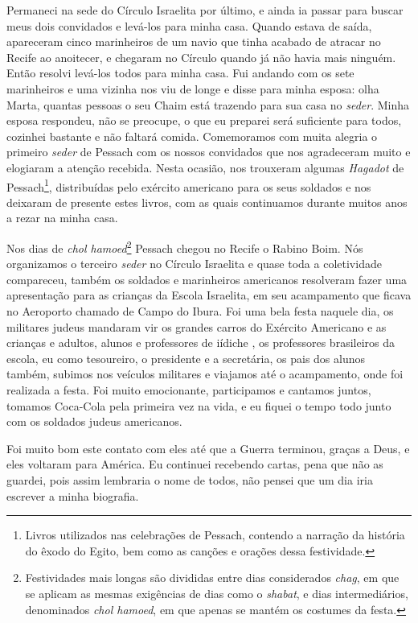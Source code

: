 Permaneci na sede do Círculo Israelita por último, e ainda ia passar
para buscar meus dois convidados e levá-los para minha casa. Quando
estava de saída, apareceram cinco marinheiros de um navio que tinha
acabado de atracar no Recife ao anoitecer, e chegaram no Círculo quando
já não havia mais ninguém. Então resolvi levá-los todos para minha casa.
Fui andando com os sete marinheiros e uma vizinha nos viu de longe e
disse para minha esposa: olha Marta, quantas pessoas o seu Chaim está
trazendo para sua casa no \textit{seder}. Minha esposa respondeu, não se
preocupe, o que eu preparei será suficiente para todos, cozinhei
bastante e não faltará comida. Comemoramos com muita alegria o primeiro
\textit{seder} de Pessach com os nossos convidados que nos agradeceram muito e
elogiaram a atenção recebida. Nesta ocasião, nos trouxeram algumas
\textit{Hagadot} de Pessach\footnote{Livros utilizados nas celebrações de
  Pessach, contendo a narração da história do êxodo do Egito, bem como
  as canções e orações dessa festividade.}, distribuídas pelo exército
americano para os seus soldados e nos deixaram de presente estes livros,
com as quais continuamos durante muitos anos a rezar na minha casa.

Nos dias de \textit{chol hamoed}\footnote{Festividades mais longas são divididas
  entre dias considerados \textit{chag}, em que se aplicam as mesmas exigências
  de dias como o \textit{shabat}, e dias intermediários, denominados \textit{chol hamoed},
  em que apenas se mantém os costumes da festa.} Pessach chegou no
Recife o Rabino Boim. Nós organizamos o terceiro \textit{seder} no Círculo
Israelita e quase toda a coletividade compareceu, também os soldados e
marinheiros americanos resolveram fazer uma apresentação para as
crianças da Escola Israelita, em seu acampamento que ficava no Aeroporto
chamado de Campo do Ibura. Foi uma bela festa naquele dia, os militares
judeus mandaram vir os grandes carros do Exército Americano e as
crianças e adultos, alunos e professores de iídiche , os professores
brasileiros da escola, eu como tesoureiro, o presidente e a secretária,
os pais dos alunos também, subimos nos veículos militares e viajamos até
o acampamento, onde foi realizada a festa. Foi muito emocionante,
participamos e cantamos juntos, tomamos Coca-Cola pela primeira vez na
vida, e eu fiquei o tempo todo junto com os soldados judeus americanos.

Foi muito bom este contato com eles até que a Guerra terminou, graças a
Deus, e eles voltaram para América. Eu continuei recebendo cartas, pena
que não as guardei, pois assim lembraria o nome de todos, não pensei que
um dia iria escrever a minha biografia.

